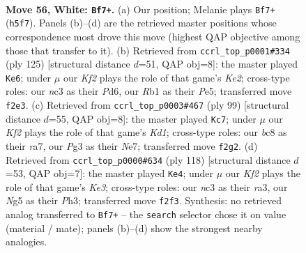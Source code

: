 \documentclass[11pt]{article}
\begin{document}
\clearpage

\begin{figure}[p]\centering
\begin{subfigure}{0.46\textwidth}\centering
\resizebox{\linewidth}{!}{%
\newchessgame
\chessboard[
  setfen={2b3k1/P2n4/4p3/5pNB/1pN2P2/1Pn3P1/5K1P/1R6 w - - 1 56},
  showmover=false,
  pgfstyle=straightmove, color=movearrow, markmove={h5-f7}
]}
\caption{}
\end{subfigure}\hfill
\begin{subfigure}{0.46\textwidth}\centering
\resizebox{\linewidth}{!}{%
\newchessgame
\chessboard[
  setfen={8/1p1nk3/p2p2p1/P2Np1P1/1P2P3/5R2/3K4/6r1 b - - 16 63},
  showmover=false,
  pgfstyle=straightmove, color=movearrow, markmove={e7-e6}
]}
\caption{}
\end{subfigure}
\\[4pt]
\begin{subfigure}{0.46\textwidth}\centering
\resizebox{\linewidth}{!}{%
\newchessgame
\chessboard[
  setfen={3k4/RN2n1p1/4p2p/2p2p1P/2P2P2/6r1/4K3/8 b - - 16 50},
  showmover=false,
  pgfstyle=straightmove, color=movearrow, markmove={d8-c7}
]}
\caption{}
\end{subfigure}\hfill
\begin{subfigure}{0.46\textwidth}\centering
\resizebox{\linewidth}{!}{%
\newchessgame
\chessboard[
  setfen={8/5p1k/2nNp2p/2P3p1/6P1/r3KP1P/8/2R5 w - - 2 60},
  showmover=false,
  pgfstyle=straightmove, color=movearrow, markmove={e3-e4}
]}
\caption{}
\end{subfigure}
\caption{\textbf{Move 56, White: \texttt{Bf7+}.} (a) Our position; Melanie plays \texttt{Bf7+} (\texttt{h5f7}). Panels (b)--(d) are the retrieved master positions whose correspondence most drove this move (highest QAP objective among those that transfer to it). (b) Retrieved from \texttt{ccrl\_top\_p0001\#334} (ply 125) [structural distance $d$=51, QAP obj=8]: the master played \texttt{Ke6}; under $\mu$ our \emph{Kf2} plays the role of that game's \emph{Ke2}; cross-type roles: our \emph{n}c3 as their \emph{P}d6, our \emph{R}b1 as their \emph{P}e5; transferred move \texttt{f2e3}. (c) Retrieved from \texttt{ccrl\_top\_p0003\#467} (ply 99) [structural distance $d$=55, QAP obj=8]: the master played \texttt{Kc7}; under $\mu$ our \emph{Kf2} plays the role of that game's \emph{Kd1}; cross-type roles: our \emph{b}c8 as their \emph{r}a7, our \emph{P}g3 as their \emph{N}e7; transferred move \texttt{f2g2}. (d) Retrieved from \texttt{ccrl\_top\_p0000\#634} (ply 118) [structural distance $d$=53, QAP obj=7]: the master played \texttt{Ke4}; under $\mu$ our \emph{Kf2} plays the role of that game's \emph{Ke3}; cross-type roles: our \emph{n}c3 as their \emph{r}a3, our \emph{N}g5 as their \emph{P}h3; transferred move \texttt{f2f3}. Synthesis: no retrieved analog transferred to \texttt{Bf7+} -- the \texttt{search} selector chose it on value (material / mate); panels (b)--(d) show the strongest nearby analogies.}
\label{fig:thought-m110}
\end{figure}
\end{document}
